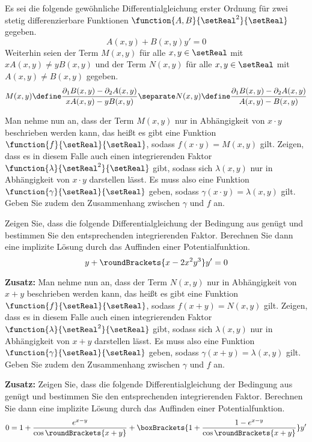 \begin{atiTask}[
  title = Spezielle integrierende Faktoren
  ]
  Es sei die folgende gewöhnliche Differentialgleichung erster Ordnung für zwei stetig differenzierbare Funktionen $\function{A,B}{\setReal^2}{\setReal}$ gegeben.
  \[
    A(x,y) + B(x,y)y' = 0
  \]
  Weiterhin seien der Term $M(x,y)$ für alle $x,y\in\setReal$ mit $xA(x,y)\neq yB(x,y)$ und der Term $N(x,y)$ für alle $x,y\in\setReal$ mit $A(x,y)\neq B(x,y)$ gegeben.
  \[
    M(x,y) \define \frac{\partial_1B(x,y) - \partial_2A(x,y)}{xA(x,y)-yB(x,y)}
    \separate
    N(x,y) \define \frac{\partial_1B(x,y) - \partial_2A(x,y)}{A(x,y)-B(x,y)}
  \]
  \begin{atiSubtasks}
    \item{
      Man nehme nun an, dass der Term $M(x,y)$ nur in Abhängigkeit von $x\cdot y$ beschrieben werden kann, das heißt es gibt eine Funktion $\function{f}{\setReal}{\setReal}$, sodass $f(x\cdot y) = M(x,y)$ gilt.
      Zeigen, dass es in diesem Falle auch einen integrierenden Faktor $\function{\lambda}{\setReal^2}{\setReal}$ gibt, sodass sich $\lambda(x,y)$ nur in Abhängigkeit von $x\cdot y$ darstellen lässt.
      Es muss also eine Funktion $\function{\gamma}{\setReal}{\setReal}$ geben, sodass $\gamma(x\cdot y) = \lambda(x,y)$ gilt.
      Geben Sie zudem den Zusammenhang zwischen $\gamma$ und $f$ an.
    }
    \item{
      Zeigen Sie, dass die folgende Differentialgleichung der Bedingung aus  genügt und bestimmen Sie den entsprechenden integrierenden Faktor.
      Berechnen Sie dann eine implizite Lösung durch das Auffinden einer Potentialfunktion.
      \[
        y + \roundBrackets{x - 2x^2y^3}y' = 0
      \]
    }
    \item{
      \textbf{Zusatz:}
      Man nehme nun an, dass der Term $N(x,y)$ nur in Abhängigkeit von $x+ y$ beschrieben werden kann, das heißt es gibt eine Funktion $\function{f}{\setReal}{\setReal}$, sodass $f(x+ y) = N(x,y)$ gilt.
      Zeigen, dass es in diesem Falle auch einen integrierenden Faktor $\function{\lambda}{\setReal^2}{\setReal}$ gibt, sodass sich $\lambda(x,y)$ nur in Abhängigkeit von $x+ y$ darstellen lässt.
      Es muss also eine Funktion $\function{\gamma}{\setReal}{\setReal}$ geben, sodass $\gamma(x+ y) = \lambda(x,y)$ gilt.
      Geben Sie zudem den Zusammenhang zwischen $\gamma$ und $f$ an.
    }
    \item{
      \textbf{Zusatz:}
      Zeigen Sie, dass die folgende Differentialgleichung der Bedingung aus  genügt und bestimmen Sie den entsprechenden integrierenden Faktor.
      Berechnen Sie dann eine implizite Lösung durch das Auffinden einer Potentialfunktion.
      \[
        0 = 1 + \frac{e^{x-y}}{\cos\roundBrackets{x+y}} + \boxBrackets{1 + \frac{1-e^{x-y}}{\cos\roundBrackets{x+y}}}y'
      \]
    }
  \end{atiSubtasks}
\end{atiTask}